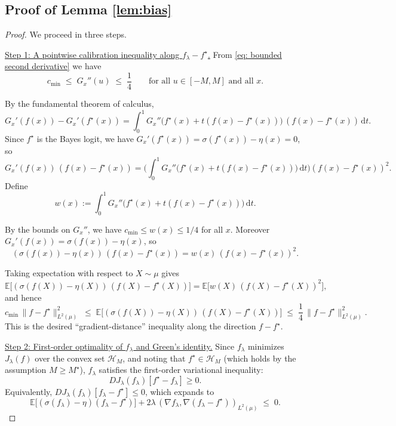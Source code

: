 \documentclass[11pt]{article}
\newcommand{\E}{\mathbb{E}}
\theoremstyle{plain}
\theoremstyle{definition}
\theoremstyle{remark}
\newcommand{\proofstep}[1]{\par\medskip\noindent\uline{#1}}
\begin{document}
\subsection{Proof of Lemma \ref{lem:bias}}
\begin{proof}
We proceed in three steps.

\proofstep{Step 1: A pointwise calibration inequality along $f_\lambda-f^\star$.}
From \eqref{eq: bounded second derivative} we have
\[
  c_{\min}
  \;\le\;
  G_x''(u)
  \;\le\;
  \frac{1}{4}
  \qquad\text{for all }u\in[-M,M]\text{ and all }x.
\]

By the fundamental theorem of calculus,
\[
  G_x'(f(x)) - G_x'(f^\star(x))
  = \int_0^1 G_x''\big(f^\star(x)+t(f(x)-f^\star(x))\big)\,(f(x)-f^\star(x))\,\mathrm dt.
\]
Since $f^\star$ is the Bayes logit, we have
$G_x'(f^\star(x)) = \sigma(f^\star(x))-\eta(x) = 0$, so
\[
  G_x'(f(x))\,(f(x)-f^\star(x))
  = \Bigg(\int_0^1 G_x''\big(f^\star(x)+t(f(x)-f^\star(x))\big)\,\mathrm dt\Bigg)
    (f(x)-f^\star(x))^2.
\]
Define
\[
  w(x):= \int_0^1 G_x''\big(f^\star(x)+t(f(x)-f^\star(x))\big)\,\mathrm dt.
\]

By the bounds on $G_x''$, we have
$c_{\min}\le w(x)\le 1/4$ for all $x$.
Moreover $G_x'(f(x))=\sigma(f(x))-\eta(x)$, so
\[
  (\sigma(f(x))-\eta(x))\,(f(x)-f^\star(x))
  = w(x)\,(f(x)-f^\star(x))^2.
\]

Taking expectation with respect to $X\sim\mu$ gives
\[
  \E\big[(\sigma(f(X))-\eta(X))\,(f(X)-f^\star(X))\big]
  = \E\big[w(X)\,(f(X)-f^\star(X))^2\big],
\]
and hence
\begin{equation}
  c_{\min}\,\|f-f^\star\|_{L^2(\mu)}^2
  \;\le\;
  \E\big[(\sigma(f(X))-\eta(X))\,(f(X)-f^\star(X))\big]
  \;\le\;
  \frac{1}{4}\,\|f-f^\star\|_{L^2(\mu)}^2.
  \label{eq:graddistance-sandwich}
\end{equation}
This is the desired ``gradient-distance'' inequality along the
direction $f-f^\star$.

\proofstep{Step 2: First-order optimality of $f_\lambda$ and Green's identity.} Since $f_\lambda$ minimizes $J_\lambda(f)$ over the convex set $\mathcal{H}_M$, and noting that $f^\star \in \mathcal{H}_M$ (which holds by the assumption $M \ge M^\star$), $f_\lambda$ satisfies the first-order variational inequality:
\[
  DJ_\lambda(f_\lambda)[f^\star - f_\lambda] \ge 0.
\]
Equivalently, \(DJ_\lambda(f_\lambda)[f_\lambda-f^\star]\le0\), which expands to
\begin{equation}
  \E\big[(\sigma(f_\lambda)-\eta)(f_\lambda-f^\star)\big]
  + 2\lambda\,(\nabla f_\lambda,\nabla(f_\lambda-f^\star))_{L^2(\mu)}
  \;\le\; 0.
  \label{eq:FOC-h=Delta}
\end{equation}


\end{proof}
\end{document}
